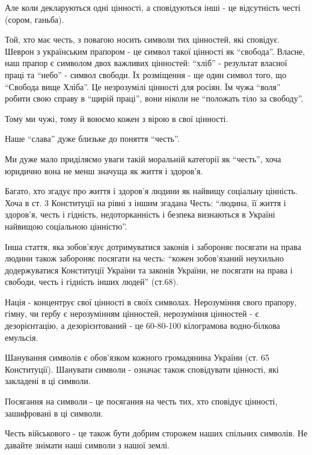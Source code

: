 \begin{itemize}
\begin{multicols}{2}
Але коли декларуються одні цінності, а сповідуються інші - це відсутність честі
(сором, ганьба).

Той, хто має честь, з повагою носить символи тих цінностей, які сповідує.
Шеврон з українським прапором - це символ такої цінності як \enquote{свобода}. Власне,
наш прапор є символом двох важливих цінностей: \enquote{хліб} - результат власної праці
та \enquote{небо} - символ свободи. Їх розміщення - ще один символ того, що \enquote{Свобода
вище Хліба}. Це незрозумілі цінності для росіян. Їм чужа \enquote{воля} робити свою
справу в \enquote{щирій праці}, вони ніколи не \enquote{положать тіло за свободу}.

Тому ми чужі, тому й воюємо кожен з вірою в свої цінності.

Наше \enquote{слава} дуже близьке до поняття \enquote{честь}.

Ми дуже мало приділяємо уваги такій моральній категорії як \enquote{честь}, хоча
юридично вона не менш значуща як життя і здоров'я.

Багато, хто згадує про життя і здоров'я людини як найвищу соціальну цінність.
Хоча в ст. 3 Конституції на рівні з іншим згадана Честь: \enquote{людина, її життя і
здоров'я, честь і гідність, недоторканність і безпека визнаються в Україні
найвищою соціальною цінністю}.

Інша стаття, яка зобов'язує дотримуватися законів і забороняє посягати на права
людини також забороняє посягати на честь: \enquote{кожен зобов'язаний неухильно
додержуватися Конституції України та законів України, не посягати на права і
свободи, честь і гідність інших людей} (ст.68).

Нація - концентрує свої цінності в своїх символах. Нерозуміння свого прапору,
гімну, чи гербу є нерозумінням цінностей, нерозуміння цінностей - є
дезорієнтацію, а дезорієнтований - це 60-80-100 кілограмова водно-білкова
емульсія.

Шанування символів є обов'язком кожного громадянина України (ст. 65
Конституції). Шанувати символи - означає також сповідувати цінності, які
закладені в ці символи.

Посягання на символи - це посягання на честь тих, хто сповідує цінності,
зашифровані в ці символи.

Честь військового - це також бути добрим сторожем наших спільних символів. Не
давайте знімати наші символи з нашої землі.

\end{multicols} %



\end{itemize}

